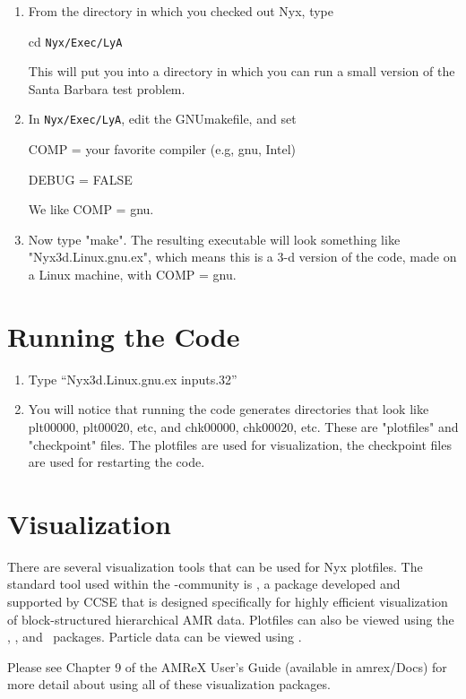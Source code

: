 \begin{enumerate}

\item From the directory in which you checked out Nyx, type

cd {\tt Nyx/Exec/LyA}

This will put you into a directory in which you can run a small
version of the Santa Barbara test problem.

\item In {\tt Nyx/Exec/LyA}, edit the GNUmakefile, and set

COMP = your favorite compiler (e.g, gnu, Intel)

DEBUG = FALSE

We like COMP = gnu.

\item Now type "make". The resulting executable will look something like 
"Nyx3d.Linux.gnu.ex", which means this is a 3-d version of the code, 
made on a Linux machine, with COMP = gnu.

\end{enumerate}

\section{Running the Code}

\begin{enumerate}

\item Type ``Nyx3d.Linux.gnu.ex inputs.32''

\item You will notice that running the code generates directories that look like 
plt00000, plt00020, etc, and chk00000, chk00020, etc. These are "plotfiles" and 
"checkpoint" files. The plotfiles are used for visualization, the checkpoint files are 
used for restarting the code.

\end{enumerate}

\section{Visualization}

There are several visualization tools that can be used for Nyx
plotfiles.  The standard tool used within the
\amrex-community is \amrvis, a package developed and supported
by CCSE that is designed specifically for highly efficient visualization
of block-structured hierarchical AMR data.
Plotfiles can also be viewed using the \visit, \paraview, and \yt\ packages.
Particle data can be viewed using \paraview.

Please see Chapter 9 of the AMReX User's Guide (available in amrex/Docs)
for more detail about using all of these visualization packages.
